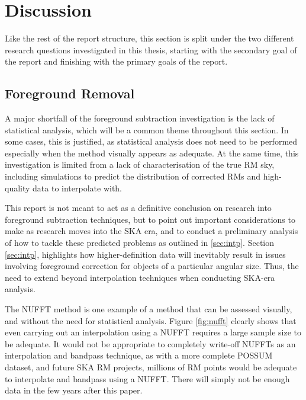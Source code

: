\chapter{Discussion}
\label{cha:discussion}

Like the rest of the report structure, this section is split under the two different research questions investigated in this thesis, starting with the secondary goal of the report and finishing with the primary goals of the report.

\section{Foreground Removal}
\label{sec:fr_disc}

A major shortfall of the foreground subtraction investigation is the lack of statistical analysis, which will be a common theme throughout this section. In some cases, this is justified, as statistical analysis does not need to be performed especially when the method visually appears as adequate. At the same time, this investigation is limited from a lack of characterisation of the true RM sky, including simulations to predict the distribution of corrected RMs and high-quality data to interpolate with.


This report is not meant to act as a definitive conclusion on research into foreground subtraction techniques, but to point out important considerations to make as research moves into the SKA era, and to conduct a preliminary analysis of how to tackle these predicted problems as outlined in \ref{sec:intp}. Section \ref{sec:intp}, highlights how higher-definition data will inevitably result in issues involving foreground correction for objects of a particular angular size. Thus, the need to extend beyond interpolation techniques when conducting SKA-era analysis.


The NUFFT method is one example of a method that can be assessed visually, and without the need for statistical analysis. Figure \ref{fig:nufft} clearly shows that even carrying out an interpolation using a NUFFT requires a large sample size to be adequate. It would not be appropriate to completely write-off NUFFTs as an interpolation and bandpass technique, as with a more complete POSSUM dataset, and future SKA RM projects, millions of RM points would be adequate to interpolate and bandpass using a NUFFT. There will simply not be enough data in the few years after this paper.


